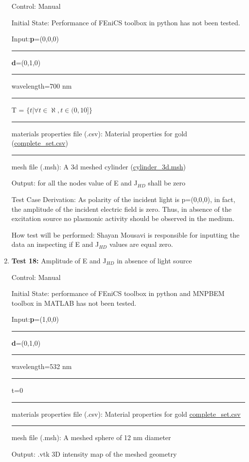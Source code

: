 \documentclass[12pt, titlepage]{article}
\begin{document}
\begin{enumerate}
Control: Manual 

Initial State: Performance of FEniCS toolbox in python has not been tested. 

Input:\textbf{p}=(0,0,0)\\
\rule{1.3cm}{0pt}\textbf{d}=(0,1,0)\\
\rule{1.3cm}{0pt}wavelength=700 nm\\ 
\rule{1.3cm}{0pt}T = $\{t| \forall t \in \aleph, t \in (0,10]\}$\\
\rule{1.3cm}{0pt}materials properties file (.csv): Material properties for gold (\href{https://github.com/shmouses/SPDFM/blob/master/src/TestCase/complete\_set.csv}{complete\_set.csv})\\
\rule{1.3cm}{0pt}mesh file (.msh): A 3d meshed cylinder (\href{https://github.com/shmouses/SPDFM/blob/master/src/TestCase/cylinder\_3d.msh}{cylinder\_3d.msh})

Output: for all the nodes value of E and J$_{HD}$ shall be zero 

Test Case Derivation: As polarity of the incident light is p=(0,0,0), in fact, the amplitude of the incident electric field is zero. Thus, in absence of the excitation source no plasmonic activity should be observed in the medium. 

How test will be performed: Shayan Mousavi is responsible for inputting the data an inspecting if E and J$_{HD}$ values are equal zero.  
\\
\item{\textbf{Test 18:} Amplitude of E and J$_{HD}$ in absence of light source\\}

Control: Manual 

Initial State:  performance of FEniCS toolbox in python and MNPBEM toolbox in MATLAB has not been tested. 

Input:\textbf{p}=(1,0,0)\\
\rule{1.1cm}{0pt}\textbf{d}=(0,1,0)\\
\rule{1.1cm}{0pt}wavelength=532 nm\\ 
\rule{1.1cm}{0pt}t=0\\
\rule{1.1cm}{0pt}materials properties file (.csv): Material properties for gold  \href{https://github.com/shmouses/SPDFM/blob/master/src/TestCase/complete\_set.csv}{complete\_set.csv}\\
\rule{1.1cm}{0pt}mesh file (.msh): A meshed sphere of 12 nm diameter

Output: .vtk 3D intensity map of the meshed geometry


\end{enumerate}
\end{document}

